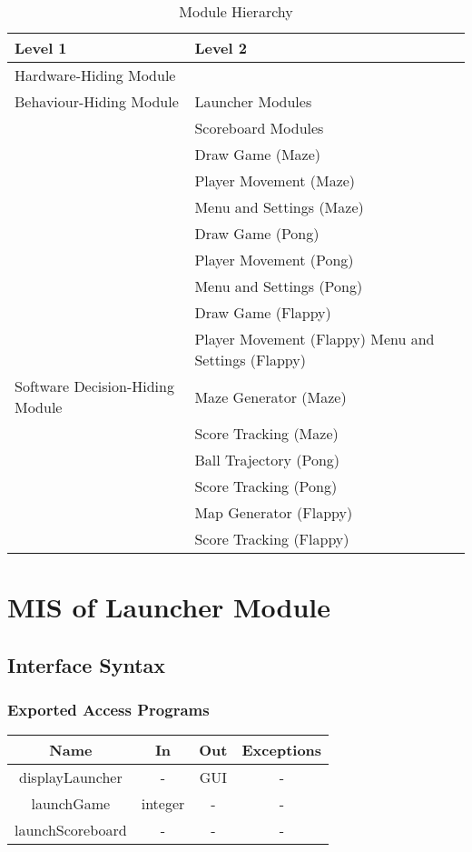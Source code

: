 \documentclass[12pt, titlepage]{article}
\begin{document}
\begin{table}[h!]
    \centering
    \begin{tabular}{p{} p{}}
    \toprule
    \textbf{Level 1} & \textbf{Level 2}\\
    \midrule
        {Hardware-Hiding Module} & ~ \\
    \midrule
        \multirow{1}{0.3\textwidth}{Behaviour-Hiding Module}
        & Launcher Modules\\
        & Scoreboard Modules\\
        & Draw Game (Maze)\\
        & Player Movement (Maze)\\
        & Menu and Settings (Maze)\\ 
        & Draw Game (Pong)\\
        & Player Movement (Pong)\\
        & Menu and Settings (Pong)\\ 
        & Draw Game (Flappy)\\
        & Player Movement (Flappy)
        Menu and Settings (Flappy)\\
    \midrule
        \multirow{1}{0.3\textwidth}{Software Decision-Hiding Module}
        & Maze Generator (Maze)\\
        & Score Tracking (Maze)\\ 
        & Ball Trajectory (Pong)\\
        & Score Tracking (Pong) \\ 
        & Map Generator (Flappy)\\
        & Score Tracking (Flappy)\\
    \bottomrule
\end{tabular}
\caption{Module Hierarchy}
\label{TblMH}
\end{table}

\section{MIS of Launcher Module}
		\subsection{Interface Syntax}
		\subsubsection{Exported Access Programs}
		\begin{tabular}[pos]{|c|c|c|c|}
			\hline
			\textbf{Name}& \textbf{In} & \textbf{Out} & \textbf{Exceptions} \\ \hline
			displayLauncher & - & GUI & - \\ \hline
			launchGame & integer & - & - \\ \hline
			launchScoreboard & - & - & - \\ \hline
		\end{tabular}
\end{document}
